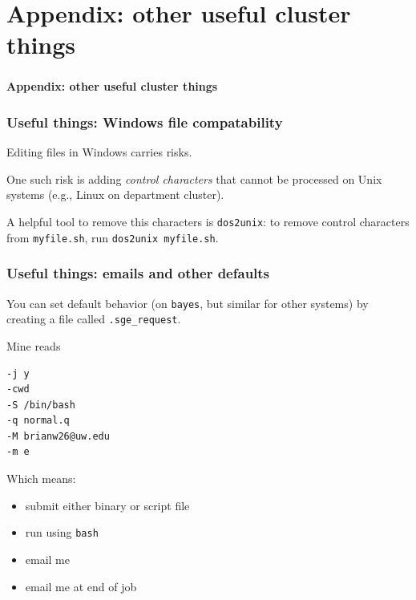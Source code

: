 \documentclass[12pt, 
hyperref={colorlinks=true, linkcolor=BlueViolet, urlcolor=BlueViolet},dvipsnames]{beamer}
\begin{document}
\section*{Appendix: other useful cluster things}
\begin{frame}
\frametitle{}
\begin{center}
{\large \textbf{Appendix: other useful cluster things}}
\end{center}
\end{frame}
\begin{frame}
\frametitle{Useful things: Windows file compatability}
Editing files in Windows carries risks. 

One such risk is adding \textit{control characters} that cannot be processed on Unix systems (e.g., Linux on department cluster).

A helpful tool to remove this characters is \texttt{dos2unix}: to remove control characters from \texttt{myfile.sh}, run \texttt{dos2unix myfile.sh}.
\end{frame}

\begin{frame}[fragile]
\frametitle{Useful things: emails and other defaults}
You can set default behavior (on \texttt{bayes}, but similar for other systems) by creating a file called \texttt{.sge\_request}. 

Mine reads \vspace{-0.3cm}
\begin{verbatim}
-j y
-cwd
-S /bin/bash
-q normal.q
-M brianw26@uw.edu
-m e
\end{verbatim}

Which means: \vspace{-0.3cm}
\begin{itemize}
\item submit either binary or script file
\item run using \texttt{bash}
\item email me
\item email me at end of job
\end{itemize}
\end{frame}
\end{document}
